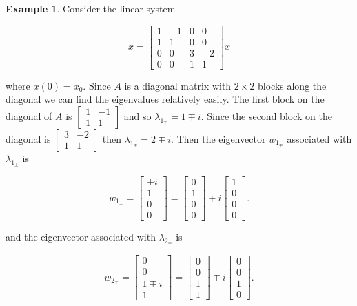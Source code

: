 \documentclass[12pt]{article}
\theoremstyle{definition}
\newtheorem*{example}{Example}
\begin{document}
\begin{example}
Consider the linear system

\[
\dot x =
\begin{bmatrix}
1 & -1 & 0 & 0 \\
1 & 1 & 0 & 0 \\
0 & 0 & 3 & -2 \\
0 & 0 & 1 & 1
\end{bmatrix}
x
\]


where $x(0) = x_0$. Since $A$ is a diagonal matrix with $2 \times 2$ blocks along the diagonal we
can find the eigenvalues relatively easily. The first block on the diagonal of $A$ is 
$\begin{bmatrix} 1 & -1 \\ 1 & 1 \end{bmatrix}$ and so $\lambda_{1_{\mp}} = 1 \mp i$. Since the
second block on the diagonal is $\begin{bmatrix} 3 & -2 \\ 1 & 1 \end{bmatrix}$ then 
$\lambda_{1_{\mp}} = 2 \mp i$. Then the eigenvector $w_{1_{\mp}}$ associated with $\lambda_{1_{\pm}}$
is 

\[
w_{1_{\mp}} =
\begin{bmatrix}
\pm i \\
1 \\
0 \\
0
\end{bmatrix}
=
\begin{bmatrix}
0 \\
1 \\
0 \\
0
\end{bmatrix}
\mp
i
\begin{bmatrix}
1 \\
0 \\
0 \\
0
\end{bmatrix}.
\]

and the eigenvector associated with $\lambda_{2_{\mp}}$ is

\[
w_{2_{\mp}} = 
\begin{bmatrix}
0 \\
0 \\
1 \mp i \\
1
\end{bmatrix}
=
\begin{bmatrix}
0 \\
0 \\
1 \\
1
\end{bmatrix}
\mp i
\begin{bmatrix}
0 \\
0 \\
1 \\
0
\end{bmatrix}.
\]


\end{example}
\end{document}
